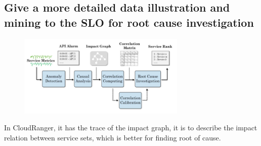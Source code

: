 \documentclass[acmlarge]{acmart}
\begin{document}
\subsection{Give a more detailed data illustration and mining to the SLO for root cause investigation\cite{wang2018cloudranger}}
\begin{figure}[htbp]
  \centering
  \includegraphics[width=8cm]{./cloudranger.png}
\end{figure}
In CloudRanger, it has the trace of the impact graph, it is to describe the impact relation between service sets, which is better for finding root of cause.


\end{document}
